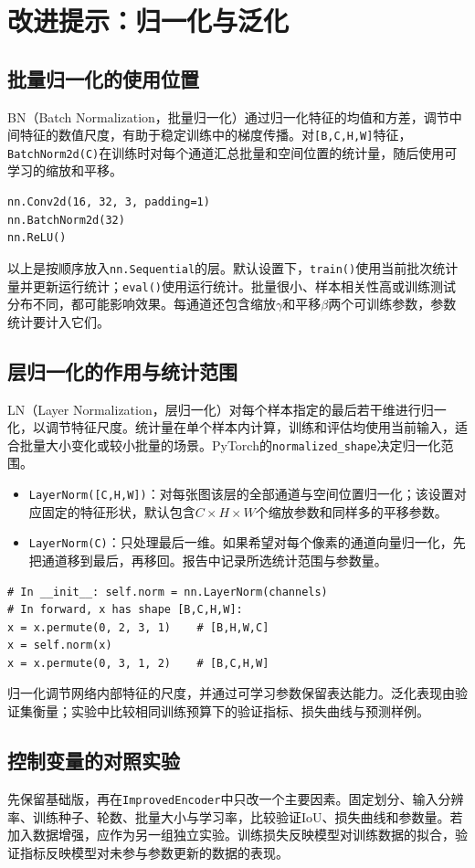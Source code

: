 \documentclass[UTF8,a4paper,11pt,fontset=fandol]{ctexart}
\newcommand{\file}[1]{\nolinkurl{#1}}
\newcommand{\shape}[1]{\texttt{#1}}
\begin{document}
\section{改进提示：归一化与泛化}
\subsection{批量归一化的使用位置}
BN（Batch Normalization，批量归一化）通过归一化特征的均值和方差，调节中间特征的数值尺度，有助于稳定训练中的梯度传播。对\shape{[B,C,H,W]}特征，\file{BatchNorm2d(C)}在训练时对每个通道汇总批量和空间位置的统计量，随后使用可学习的缩放和平移。
\begin{lstlisting}
nn.Conv2d(16, 32, 3, padding=1)
nn.BatchNorm2d(32)
nn.ReLU()
\end{lstlisting}
以上是按顺序放入\file{nn.Sequential}的层。默认设置下，\file{train()}使用当前批次统计量并更新运行统计；\file{eval()}使用运行统计。批量很小、样本相关性高或训练测试分布不同，都可能影响效果。每通道还包含缩放$\gamma$和平移$\beta$两个可训练参数，参数统计要计入它们。
\subsection{层归一化的作用与统计范围}
LN（Layer Normalization，层归一化）对每个样本指定的最后若干维进行归一化，以调节特征尺度。统计量在单个样本内计算，训练和评估均使用当前输入，适合批量大小变化或较小批量的场景。PyTorch的\file{normalized_shape}决定归一化范围。
\begin{itemize}
\item \file{LayerNorm([C,H,W])}：对每张图该层的全部通道与空间位置归一化；该设置对应固定的特征形状，默认包含$C\times H\times W$个缩放参数和同样多的平移参数。
\item \file{LayerNorm(C)}：只处理最后一维。如果希望对每个像素的通道向量归一化，先把通道移到最后，再移回。报告中记录所选统计范围与参数量。
\end{itemize}
\begin{lstlisting}
# In __init__: self.norm = nn.LayerNorm(channels)
# In forward, x has shape [B,C,H,W]:
x = x.permute(0, 2, 3, 1)    # [B,H,W,C]
x = self.norm(x)
x = x.permute(0, 3, 1, 2)    # [B,C,H,W]
\end{lstlisting}
\begin{keybox}[归一化与泛化]
归一化调节网络内部特征的尺度，并通过可学习参数保留表达能力。泛化表现由验证集衡量；实验中比较相同训练预算下的验证指标、损失曲线与预测样例。
\end{keybox}
\subsection{控制变量的对照实验}
先保留基础版，再在\file{ImprovedEncoder}中只改一个主要因素。固定划分、输入分辨率、训练种子、轮数、批量大小与学习率，比较验证IoU、损失曲线和参数量。若加入数据增强，应作为另一组独立实验。训练损失反映模型对训练数据的拟合，验证指标反映模型对未参与参数更新的数据的表现。
\clearpage
\end{document}
